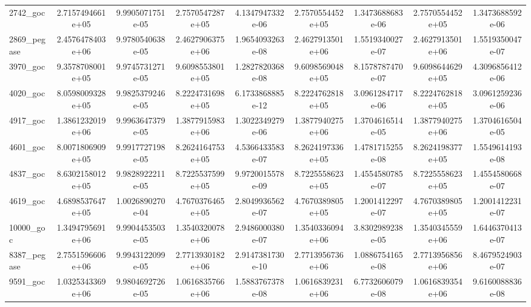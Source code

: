 \documentclass{standalone}
\begin{document}
\begin{tabular}{|l|cc|cc|cc|cc|}
2742\_goc 
& 2.7157494661e+05
& 9.9905071751e-05
& 2.7570547287e+05
& 4.1347947332e-06
& 2.7570554452e+05
& 1.3473688683e-06
& 2.7570554452e+05
& 1.3473688592e-06
\\

2869\_pegase 
& 2.4576478403e+06
& 9.9780540638e-05
& 2.4627906375e+06
& 1.9654093263e-08
& 2.4627913501e+06
& 1.5519340027e-07
& 2.4627913501e+06
& 1.5519350047e-07
\\
\hline
3970\_goc 
& 9.3578708001e+05
& 9.9745731271e-05
& 9.6098553801e+05
& 1.2827820368e-08
& 9.6098569048e+05
& 8.1578787470e-07
& 9.6098644629e+05
& 4.3096856412e-06
\\

4020\_goc 
& 8.0598009328e+05
& 9.9825379246e-05
& 8.2224731698e+05
& 6.1733868885e-12
& 8.2224762818e+05
& 3.0961284717e-06
& 8.2224762818e+05
& 3.0961259236e-06
\\

4917\_goc 
& 1.3861232019e+06
& 9.9963647379e-05
& 1.3877915983e+06
& 1.3022349279e-06
& 1.3877940275e+06
& 1.3704616514e-05
& 1.3877940275e+06
& 1.3704616504e-05
\\

4601\_goc 
& 8.0071806909e+05
& 9.9917727198e-05
& 8.2624164753e+05
& 4.5366433583e-07
& 8.2624197336e+05
& 1.4781715255e-08
& 8.2624198377e+05
& 1.5549614193e-08
\\

4837\_goc 
& 8.6302158012e+05
& 9.9828922211e-05
& 8.7225537599e+05
& 9.9720015578e-09
& 8.7225558623e+05
& 1.4554580785e-07
& 8.7225558623e+05
& 1.4554580668e-07
\\
\hline
4619\_goc 
& 4.6898537647e+05
& 1.0026890270e-04
& 4.7670376465e+05
& 2.8049936562e-07
& 4.7670389805e+05
& 1.2001412297e-07
& 4.7670389805e+05
& 1.2001412231e-07
\\

10000\_goc 
& 1.3494795691e+06
& 9.9904453503e-05
& 1.3540320078e+06
& 2.9486000380e-07
& 1.3540336094e+06
& 3.8302989238e-05
& 1.3540345559e+06
& 1.6446370413e-07
\\

8387\_pegase 
& 2.7551596606e+06
& 9.9943122099e-05
& 2.7713930182e+06
& 2.9147381730e-10
& 2.7713956736e+06
& 1.0886754165e-08
& 2.7713956856e+06
& 8.4679524903e-07
\\

9591\_goc 
& 1.0325343369e+06
& 9.9804692726e-05
& 1.0616835766e+06
& 1.5883767378e-08
& 1.0616839231e+06
& 6.7732606079e-08
& 1.0616839354e+06
& 9.6160088836e-08
\\


\end{tabular}
\end{document}
